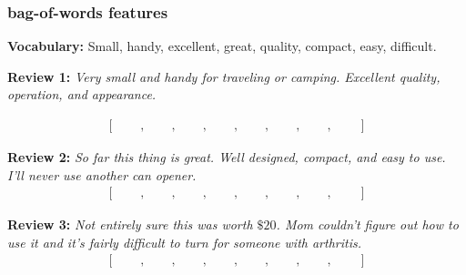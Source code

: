 \documentclass[handout,compress]{beamer}
\begin{document}
\begin{frame}
		\frametitle{bag-of-words features}
		\small
		\textbf{Vocabulary:} Small, handy, excellent, great, quality, compact, easy, difficult.
		
		\textbf{Review 1:} \textit{Very small and handy for traveling or camping. Excellent quality, operation, and appearance.}
		
		\begin{align*}
		\left[\hspace{2em},\hspace{2em},\hspace{2em},\hspace{2em},\hspace{2em},\hspace{2em},\hspace{2em},\hspace{2em}\right]
		\end{align*}
		
		\textbf{Review 2:} \textit{So far this thing is great. Well designed, compact, and easy to use. I’ll never use another can opener.} 
		\begin{align*}
		\left[\hspace{2em},\hspace{2em},\hspace{2em},\hspace{2em},\hspace{2em},\hspace{2em},\hspace{2em},\hspace{2em}\right]
		\end{align*}
		
		\textbf{Review 3:} \textit{Not entirely sure this was worth $\$20$. Mom couldn't figure out how to use it and it's fairly difficult to turn for someone with arthritis.}
				\begin{align*}
		\left[\hspace{2em},\hspace{2em},\hspace{2em},\hspace{2em},\hspace{2em},\hspace{2em},\hspace{2em},\hspace{2em}\right]
		\end{align*}
\end{frame}
\end{document}
